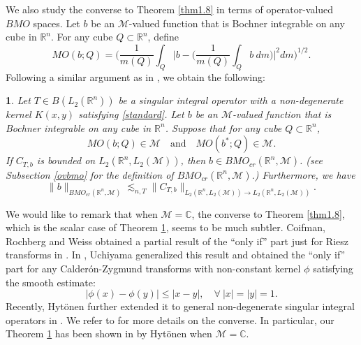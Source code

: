 \documentclass[oneside,english,a4wide]{amsart}
\numberwithin{equation}{section}
\numberwithin{figure}{section}
\theoremstyle{plain}
\newtheorem{thm}{\protect\theoremname}[section]
\theoremstyle{plain}
\theoremstyle{definition}
\theoremstyle{plain}
\theoremstyle{remark}
\theoremstyle{definition}
\theoremstyle{remark}
\theoremstyle{definition}
\providecommand{\theoremname}{Theorem}
\newcommand{\8}{\infty}
\begin{document}
We also study the converse to Theorem \ref{thm1.8} in terms of operator-valued $BMO$ spaces. Let $b$ be an $\mathcal{M}$-valued function that is Bochner integrable on any cube in $\mathbb{R}^n$. For any cube $Q\subset\mathbb{R}^n$, define
\begin{equation}\label{MOBQ}
	MO(b;Q)=\biggl(\frac{1}{m(Q)} \int_Q \Big|b-\big(\frac{1}{m(Q)} \int_Q b\ d m\big)\Big|^2 dm\biggr)^{1/2}.
\end{equation}
Following a similar argument as in \cite{TH3}, we obtain the following:
\begin{thm}\label{nonbound}
	Let $T\in B(L_2(\mathbb{R}^n))$ be a singular integral operator with a non-degenerate kernel $K(x,y)$ satisfying \eqref{standard}. Let $b$ be an $\mathcal{M}$-valued function that is Bochner integrable on any cube in $\mathbb{R}^n$. Suppose that for any cube $Q\subset\mathbb{R}^n$,
	\begin{equation*}
		MO(b;Q)\in \mathcal{M}\quad \text{and} \quad MO(b^*;Q)\in\mathcal{M}.
	\end{equation*}
	 If $C_{T, b}$ is bounded on $L_2(\mathbb{R}^n,L_2(\mathcal{M}))$, then $b\in BMO_{cr}(\mathbb{R}^n,\mathcal{M})$. (see Subsection \ref{ovbmo} for the definition of $BMO_{cr}(\mathbb{R}^n,\mathcal{M})$.) Furthermore, we have
	\begin{equation*}
		\|b\|_{BMO_{cr}(\mathbb{R}^n,\mathcal{M})}\lesssim_{n,T} \|C_{T, b}\|_{L_2(\mathbb{R}^n,L_2(\mathcal{M}))\to L_2(\mathbb{R}^n,L_2(\mathcal{M}))}.
	\end{equation*}
\end{thm}


We would like to remark that when $\mathcal{M}=\mathbb{C}$, the converse to Theorem \ref{thm1.8}, which is the scalar case of Theorem \ref{nonbound}, seems to be much subtler. Coifman, Rochberg and Weiss obtained a partial result of the ``only if'' part just for Riesz transforms in \cite{CRW}. In \cite{Uchi}, Uchiyama generalized this result and obtained the ``only if'' part for any Calder\'{o}n-Zygmund transforms with non-constant kernel $\phi$ satisfying the smooth estimate:
\begin{equation}\label{smooth}
	|\phi(x)-\phi(y)|\leq |x-y|, \quad  \forall\ |x|=|y|=1.
	\end{equation}
Recently, Hyt\"{o}nen further extended it to general non-degenerate singular integral operators in \cite{TH3}. We refer to \cite{TH3} for more details on the converse. In particular, our Theorem \ref{nonbound} has been shown in \cite{TH3} by Hyt\"{o}nen when $\mathcal{M}=\mathbb{C}$.
\end{document}
